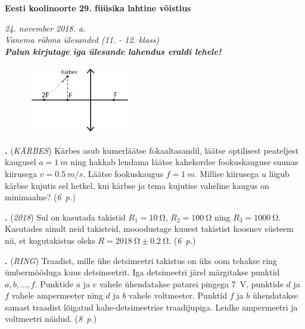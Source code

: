 \documentclass[11pt,a5paper]{article}
\newcommand{\numb}[1]{\vspace{5pt}\textbf{\large #1}}
\newcommand{\nimi}[1]{(\textsl{\small #1})}
\newcommand{\punktid}[1]{(\emph{#1~p.})}
\newcommand{\autor}[1]{}
\newcounter{ylesanne}
\newcommand{\yl}[1]{\addtocounter{ylesanne}{1}\numb{\theylesanne.} \nimi{#1} \newblock{}}
\begin{document}
\begin{center}
\textbf{\Large Eesti koolinoorte 29. füüsika lahtine võistlus} \vspace{3pt}

\emph{24. november 2018. a. \\Vanema rühma ülesanded (11. - 12. klass)}\vspace{2pt}\\
\emph{\textbf{Palun kirjutage iga ülesande lahendus eraldi lehele!}}
\end{center}
\vspace{-5pt}


\begin{figure}
	\vspace{-30pt}
	\begin{center}
		\hspace{-20pt}
		\includegraphics[width = 0.4\textwidth]{karbesjoonis.pdf}
	\end{center}
\end{figure}
\yl{KÄRBES}
Kärbes asub kumerläätse fokaaltasandil, läätse optilisest peateljest kaugusel $a = \SI{1}{m}$ ning hakkab lendama läätse kahekordse fookuskauguse suunas kiirusega $v = \SI{0,5}{m/s}$. Läätse fookuskaugus $f = \SI{1}{m}$. Millise kiirusega $u$ liigub kärbse kujutis sel hetkel, kui kärbse ja tema kujutise vaheline kaugus on minimaalne?
\punktid{6}\autor{Erkki Tempel}



\yl{2018}
Sul on kasutada takistid $R_1=\SI{10}{\ohm}$, $R_2=\SI{100}{\ohm}$ ning $R_3=\SI{1000}{\ohm}$. Kasutades ainult neid takisteid, mooodustage kuuest takistist koosnev süsteem nii, et kogutakistus oleks $R=\SI{2018}{\ohm}\pm\SI{0,2}{\ohm}$.
\punktid{6}\autor{Erkki Tempel}	



\yl{RING}
Traadist, mille ühe detsimeetri takistus on üks oom tehakse ring ümbermõõduga kuus detsimeetrit. Iga detsimeetri järel märgitakse punktid $a, b, \ldots, f$. Punktide $a$ ja $e$ vahele ühendatakse patarei pingega \SI{7}{V}, punktide $d$ ja $f$ vahele ampermeeter ning $d$ ja $b$ vahele voltmeeter. Punktid $f$ ja $b$ ühendatakse samast traadist lõigatud kahe-detsimeetrise traadijupiga. Leidke ampermeetri ja voltmeetri näidud.
\punktid{8}\autor{Jaan Kalda}
\end{document}
